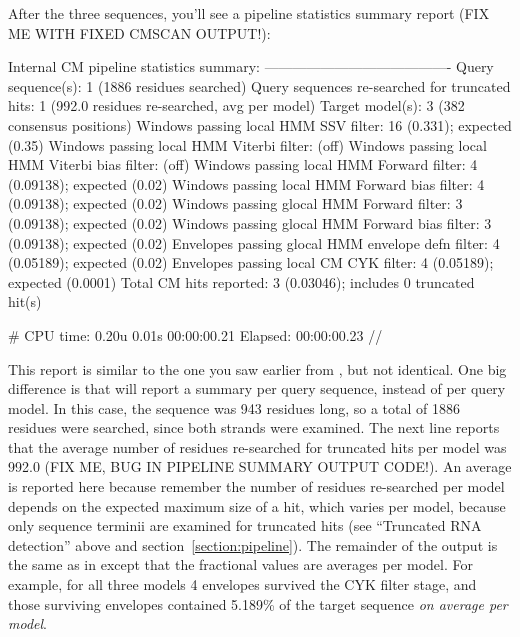 After the three sequences, you'll see a pipeline statistics summary
report (FIX ME WITH FIXED CMSCAN OUTPUT!):

\begin{sreoutput}
Internal CM pipeline statistics summary:
----------------------------------------
Query sequence(s):                                               1  (1886 residues searched)
Query sequences re-searched for truncated hits:                  1  (992.0 residues re-searched, avg per model)
Target model(s):                                                 3  (382 consensus positions)
Windows   passing  local HMM SSV           filter:              16  (0.331); expected (0.35)
Windows   passing  local HMM Viterbi       filter:                  (off)
Windows   passing  local HMM Viterbi  bias filter:                  (off)
Windows   passing  local HMM Forward       filter:               4  (0.09138); expected (0.02)
Windows   passing  local HMM Forward  bias filter:               4  (0.09138); expected (0.02)
Windows   passing glocal HMM Forward       filter:               3  (0.09138); expected (0.02)
Windows   passing glocal HMM Forward  bias filter:               3  (0.09138); expected (0.02)
Envelopes passing glocal HMM envelope defn filter:               4  (0.05189); expected (0.02)
Envelopes passing  local CM  CYK           filter:               4  (0.05189); expected (0.0001)
Total CM hits reported:                                          3  (0.03046); includes 0 truncated hit(s)

# CPU time: 0.20u 0.01s 00:00:00.21 Elapsed: 00:00:00.23
//
\end{sreoutput}

This report is similar to the one you saw earlier from
, but not identical. One big difference is that
 will report a summary per query sequence, instead of per
query model. In this case, the sequence was 943 residues long, so a
total of 1886 residues were searched, since both strands were
examined. The next line reports that the average number of residues
re-searched for truncated hits per model was 992.0 (FIX ME, BUG IN
PIPELINE SUMMARY OUTPUT CODE!). An average is reported here
because remember the number of residues re-searched per model depends
on the expected maximum size of a hit, which varies per model, because
only sequence terminii are examined for truncated hits (see
``Truncated RNA detection'' above and section~\ref{section:pipeline}).
The remainder of the output is the same as in  except
that the fractional values are averages per model. For example, for
all three models 4 envelopes survived the CYK filter stage, and those
surviving envelopes contained 5.189\% of the target sequence \emph{on
  average per model}.

